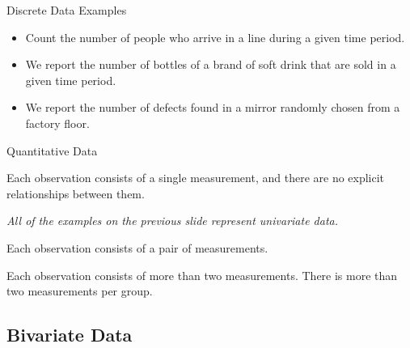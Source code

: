 \begin{frame}{Discrete Data Examples}

  \begin{itemize}
  \item Count the number of people who arrive in a line during a given
    time period.

  \item We report the number of bottles of a brand of soft drink that
    are sold in a given time period.

  \item We report the number of defects found in a mirror randomly
    chosen from a factory floor.

  \end{itemize}
  
\end{frame}


\begin{frame}{Quantitative Data}
  
  \begin{definition}

    Each observation consists of a single measurement, and there are
    no explicit relationships between them.

    \textit{{\color{red}All of the examples on the previous slide
        represent univariate data.}}
    
  \end{definition}

  \begin{definition}

    Each observation consists of a pair of measurements.
    
  \end{definition}

  \begin{definition}

    Each observation consists of more than two measurements. There is
    more than two measurements per group.
    
  \end{definition}


\end{frame}



\subsection{Bivariate Data}

